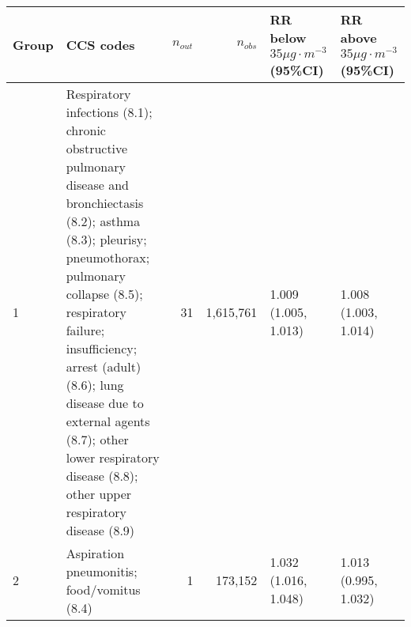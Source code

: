 \begin{tabular}{lp{6.5cm}rrp{2.2cm}p{2.2cm}}
  \hline
Group & CCS codes & $n_{out}$ & $n_{obs}$ & RR below $35 \mu g \cdot m^{-3}$ (95\%CI) & RR above $35 \mu g \cdot m^{-3}$ (95\%CI) \\ 
  \hline
   1 & Respiratory infections (8.1); chronic obstructive pulmonary disease and bronchiectasis (8.2); asthma (8.3); pleurisy; pneumothorax; pulmonary collapse (8.5); respiratory failure; insufficiency; arrest (adult) (8.6); lung disease due to external agents (8.7); other lower respiratory disease (8.8); other upper respiratory disease (8.9) &   31 & 1,615,761 & 1.009 (1.005, 1.013) & 1.008 (1.003, 1.014) \\ 
     2 & Aspiration pneumonitis; food/vomitus (8.4) &    1 & 173,152 & 1.032 (1.016, 1.048) & 1.013 (0.995, 1.032) \\ 
   \hline
\end{tabular}


